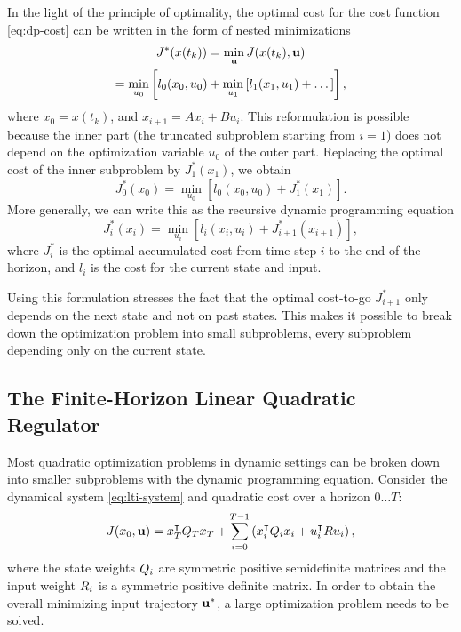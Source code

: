 In the light of the principle of optimality, the optimal cost for the
cost function \eqref{eq:dp-cost} can be written in the form of nested
minimizations
\begin{multline}
  J^*(x(t_k)) = \min_{\mathbf{u}} J(x(t_k), \mathbf{u}) \\= \min_{u_0}\left[
  l_0(x_0, u_0) + \min_{u_{1}}
  \left[ l_{1}(x_{1}, u_{1}) + \dots \right] \right],
\end{multline}
where $x_0 = x(t_k)$, and $x_{i+1} = Ax_i + Bu_i$. This reformulation is
possible because the inner part (the truncated subproblem starting from $i=1$)
does not depend on the optimization variable $u_0$ of the outer part. Replacing
the optimal cost of the inner subproblem by $J_{1}^*(x_1)$, we obtain
\begin{equation}
  J_0^*(x_0) = \min_{u_0}\left[ l_0(x_0, u_0) + J^*_{1}(x_{1})\right].
\end{equation}
More generally, we can write this as the recursive dynamic programming equation
\cite[]{Bertsekas:2005:Dynamic}
\begin{equation}
  \label{eq:dp}
  J_i^*(x_i) = \min_{u_i}\left[ l_i(x_i, u_i) + J^*_{i+1}(x_{i+1})\right],
\end{equation}
where $J_i^*$ is the optimal accumulated cost from time step $i$ to the end
of the horizon, and $l_i$ is the cost for the current state and input.

Using this formulation stresses the fact that the optimal cost-to-go $J^*_{i+1}$
only depends on the next state and not on past states. This makes it possible
to break down the optimization problem into small subproblems, every
subproblem depending only on the current state.

\subsection{The Finite-Horizon Linear Quadratic Regulator}
\label{sec:dp-control}

Most quadratic optimization problems in dynamic settings can be broken down
into smaller subproblems with the dynamic programming equation. Consider the
dynamical system \eqref{eq:lti-system} and quadratic cost over a horizon $0
\dots T$:
\begin{equation}
  \label{eq:lqdp-cost}
  J (x_0, \u) = x_T\T \SC_T x_T + \sum_{i=0}^{T-1} \left( x_i\T \SC_i x_i +
  u_i\T \CC u_i\right),
\end{equation}
where the state weights $Q_i$ are symmetric positive semidefinite matrices and
the input weight $R_i$ is a symmetric positive definite matrix. In order to
obtain the overall minimizing input trajectory $\mathbf{u}^*$, a large optimization
problem needs to be solved.

